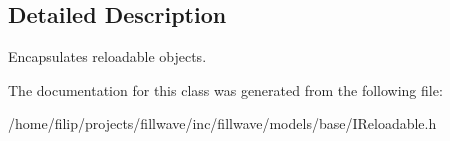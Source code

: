 \subsection{Detailed Description}
Encapsulates reloadable objects. 

The documentation for this class was generated from the following file\+:\begin{DoxyCompactItemize}
\item 
/home/filip/projects/fillwave/inc/fillwave/models/base/I\+Reloadable.\+h\end{DoxyCompactItemize}
